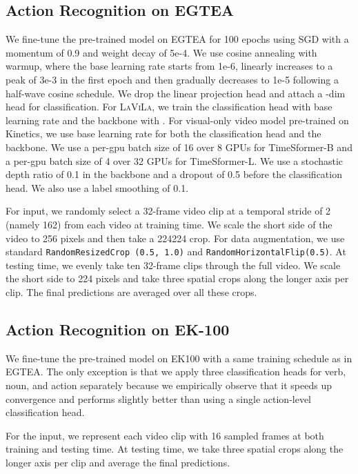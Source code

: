 \documentclass[10pt,twocolumn,letterpaper]{article}
\newcommand{\ours}{\textsc{LaViLa}\xspace}
\begin{document}
\subsection{Action Recognition on EGTEA}
We fine-tune the pre-trained model on EGTEA for 100 epochs using SGD with a momentum of 0.9 and weight decay of 5e-4.
We use cosine annealing with warmup, where the base learning rate starts from 1e-6, linearly increases to a peak of 3e-3 in the first epoch and then gradually decreases to 1e-5 following a half-wave cosine schedule.
We drop the linear projection head and attach a -dim head for classification.
For \ours, we train the classification head with  base learning rate and the backbone with .
For visual-only video model pre-trained on Kinetics, we use  base learning rate  for both the classification head and the backbone.
We use a per-gpu batch size of 16 over 8 GPUs for TimeSformer-B and a per-gpu batch size of 4 over 32 GPUs for TimeSformer-L.
We use a stochastic depth ratio of 0.1 in the backbone and a dropout of 0.5 before the classification head.
We also use a label smoothing of 0.1.

For input, we randomly select a 32-frame video clip at a temporal stride of 2 (namely 162) from each video at training time.
We scale the short side of the video to 256 pixels and then take a 224224 crop.
For data augmentation, we use standard \texttt{RandomResizedCrop (0.5, 1.0)} and \texttt{RandomHorizontalFlip(0.5)}.
At testing time, we evenly take ten 32-frame clips through the full video.
We scale the short side to 224 pixels and take three spatial crops along the longer axis per clip.
The final predictions are averaged over all these crops.

\subsection{Action Recognition on EK-100}
We fine-tune the pre-trained model on EK100 with a same training schedule as in EGTEA.
The only exception is that we apply three classification heads for verb, noun, and action separately because we empirically observe that it speeds up convergence and performs slightly better than using a single action-level classification head.

For the input, we represent each video clip with 16 sampled frames at both training and testing time.
At testing time, we take three spatial crops along the longer axis per clip and average the final predictions.
\end{document}
